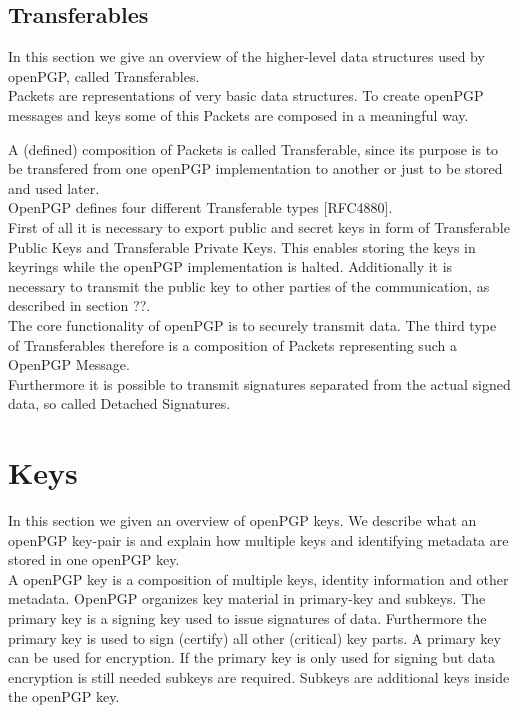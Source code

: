 \subsection{Transferables}

In this section we give an overview of the higher-level data structures used by openPGP, called Transferables.  \\

Packets are representations of very basic data structures. To create openPGP messages and keys some of this Packets are composed in a meaningful way.

A (defined) composition of Packets is called Transferable, since its purpose is to be transfered from one openPGP implementation to another or just to be stored and used later. \\

OpenPGP defines four different Transferable types [RFC4880]. \\

First of all it is necessary to export public and secret keys in form of Transferable Public Keys and Transferable Private Keys. This enables storing the keys in keyrings while the openPGP implementation is halted. Additionally it is necessary to transmit the public key to other parties of the communication, as described in section ??.  \\

The core functionality of openPGP is to securely transmit data. The third type of Transferables therefore is a composition of Packets representing such a OpenPGP Message. \\

Furthermore it is possible to transmit signatures separated from the actual signed data, so called Detached Signatures.

\section{Keys}

In this section we given an overview of openPGP keys. We describe what an openPGP key-pair is and explain how multiple keys and identifying metadata are stored in one openPGP key. \\

A openPGP key is a composition of multiple keys, identity information and other metadata. OpenPGP organizes key material in primary-key and subkeys. The primary key is a signing key used to issue signatures of data. Furthermore the primary key is used to sign (certify) all other (critical) key parts. A primary key can be used for encryption. If the primary key is only used for  signing but data encryption is still needed subkeys are required. Subkeys are additional keys inside the openPGP key.


